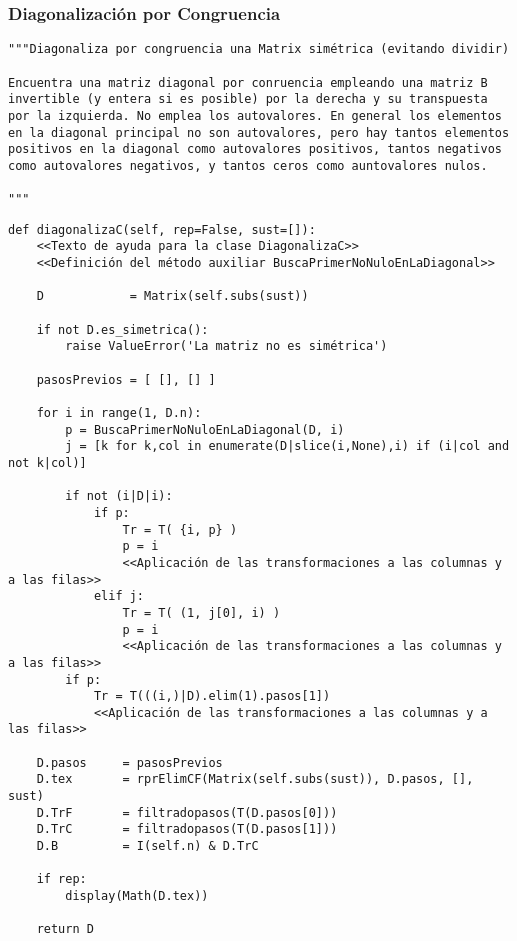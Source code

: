 \documentclass[11pt]{report}
\begin{document}
\subsubsection{Diagonalización por Congruencia}
\label{sec:org5f00e6b}

\begin{verbatim}
"""Diagonaliza por congruencia una Matrix simétrica (evitando dividir)

Encuentra una matriz diagonal por conruencia empleando una matriz B
invertible (y entera si es posible) por la derecha y su transpuesta
por la izquierda. No emplea los autovalores. En general los elementos
en la diagonal principal no son autovalores, pero hay tantos elementos
positivos en la diagonal como autovalores positivos, tantos negativos
como autovalores negativos, y tantos ceros como auntovalores nulos.

"""
\end{verbatim}


\begin{verbatim}
def diagonalizaC(self, rep=False, sust=[]):
    <<Texto de ayuda para la clase DiagonalizaC>>
    <<Definición del método auxiliar BuscaPrimerNoNuloEnLaDiagonal>>
    
    D            = Matrix(self.subs(sust))
    
    if not D.es_simetrica():
        raise ValueError('La matriz no es simétrica')
     
    pasosPrevios = [ [], [] ]
    
    for i in range(1, D.n):
        p = BuscaPrimerNoNuloEnLaDiagonal(D, i)
        j = [k for k,col in enumerate(D|slice(i,None),i) if (i|col and not k|col)]
        
        if not (i|D|i):
            if p:
                Tr = T( {i, p} )
                p = i
                <<Aplicación de las transformaciones a las columnas y a las filas>>
            elif j:
                Tr = T( (1, j[0], i) )
                p = i
                <<Aplicación de las transformaciones a las columnas y a las filas>>
        if p:
            Tr = T(((i,)|D).elim(1).pasos[1]) 
            <<Aplicación de las transformaciones a las columnas y a las filas>>
           
    D.pasos     = pasosPrevios
    D.tex       = rprElimCF(Matrix(self.subs(sust)), D.pasos, [], sust) 
    D.TrF       = filtradopasos(T(D.pasos[0]))
    D.TrC       = filtradopasos(T(D.pasos[1]))
    D.B         = I(self.n) & D.TrC
    
    if rep: 
        display(Math(D.tex))

    return D   
    
\end{verbatim}
\end{document}
